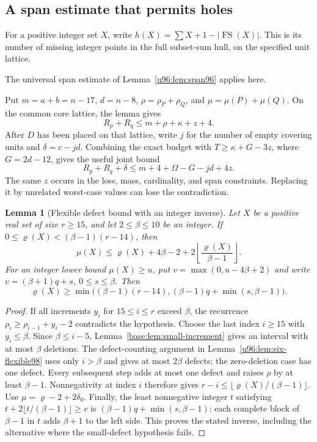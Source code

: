 \documentclass[11pt,a4paper]{article}
\newtheorem{lemma}[theorem]{Lemma}
\theoremstyle{remark}
\newcommand{\FS}{\operatorname{FS}}
\newcommand{\rhoD}{\varrho}
\begin{document}
\subsection{A span estimate that permits holes}
For a positive integer set $X$, write
$h(X)=\sum X+1-|\FS(X)|$. This is its number of missing integer points
in the full subset-sum hull, on the specified unit lattice.

The universal span estimate of Lemma~\ref{u96:lem:span96} applies here.

Put $m=a+b=n-17$, $d=n-8$, $\rho=\rho_P+\rho_Q$, and
$\mu=\mu(P)+\mu(Q)$. On the common core lattice, the lemma gives
\begin{equation}
 R_p+R_q\leq m+\rho+\kappa+z+4.
 \label{u96:eq:span96}
\end{equation}
After $D$ has been placed on that lattice, write $j$ for the number of
empty covering units and $\delta=c-jd$. Combining the exact budget with
$T\geq\kappa+G-3z$, where $G=2d-12$, gives the useful joint bound
\begin{equation}
 R_p+R_q+\delta\leq m+4+\Omega-G-jd+4z.
 \label{u96:eq:span96-budget}
\end{equation}
The same $z$ occurs in the loss, mass, cardinality, and span constraints.
Replacing it by unrelated worst-case values can lose the contradiction.

\begin{lemma}[Flexible defect bound with an integer inverse]\label{u96:lem:flex96}
Let $X$ be a positive real set of size $r\geq15$, and let
$2\leq\beta\leq10$ be an integer. If
$0\leq\rhoD(X)<(\beta-1)(r-14)$, then
\[
 \mu(X)\leq\rhoD(X)+4\beta-2+
                    2\left\lfloor\frac{\rhoD(X)}{\beta-1}\right\rfloor.
\]
For an integer lower bound $\mu(X)\geq u$, put
$v=\max(0,u-4\beta+2)$ and write $v=(\beta+1)q+s$, $0\leq s\leq\beta$.
Then
\begin{equation}
 \rhoD(X)\geq\min\bigl((\beta-1)(r-14),
                  (\beta-1)q+\min(s,\beta-1)\bigr).
 \label{u96:eq:flex96-inverse}
\end{equation}
\end{lemma}
\begin{proof}
If all increments $y_i$ for $15\leq i\leq r$ exceed $\beta$, the
recurrence $\rho_i\geq\rho_{i-1}+y_i-2$ contradicts the hypothesis.
Choose the last index $i\geq15$ with $y_i\leq\beta$.
Since $\beta\leq i-5$, Lemma~\ref{base:lem:small-increment} gives an interval
with at most $\beta$ deletions. The defect-counting argument in
Lemma~\ref{u96:lem:six-flexible98} uses only $i>\beta$ and gives at most
$2\beta$ defects; the zero-deletion case has one defect.
Every subsequent step adds at most one defect and raises $\rho$ by at
least $\beta-1$. Nonnegativity at index $i$ therefore gives
$r-i\leq\lfloor\rhoD(X)/(\beta-1)\rfloor$. Use
$\mu=\rhoD-2+2\delta_0$.
Finally, the least nonnegative integer $t$ satisfying
$t+2\lfloor t/(\beta-1)\rfloor\geq v$ is
$(\beta-1)q+\min(s,\beta-1)$: each complete block of $\beta-1$ in $t$
adds $\beta+1$ to the left side. This proves the stated inverse, including
the alternative where the small-defect hypothesis fails.
\end{proof}
\end{document}
